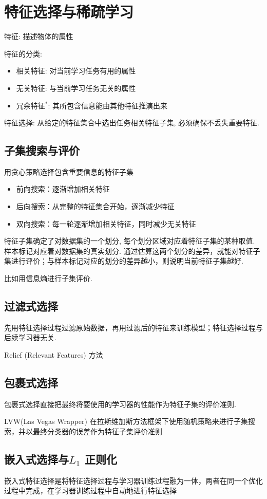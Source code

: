 \newpage
\section{特征选择与稀疏学习}
特征: 描述物体的属性

特征的分类:
\begin{itemize}
    \item 相关特征: 对当前学习任务有用的属性
    \item 无关特征: 与当前学习任务无关的属性
    \item 冗余特征${}^*$: 其所包含信息能由其他特征推演出来
\end{itemize}

特征选择: 从给定的特征集合中选出任务相关特征子集, 必须确保不丢失重要特征. 
\subsection{子集搜索与评价}
用贪心策略选择包含重要信息的特征子集
\begin{itemize}
    \item 前向搜索：逐渐增加相关特征
    \item 后向搜索：从完整的特征集合开始，逐渐减少特征
    \item 双向搜索：每一轮逐渐增加相关特征，同时减少无关特征
\end{itemize}

特征子集确定了对数据集的一个划分, 每个划分区域对应着特征子集的某种取值. 样本标记对应着对数据集的真实划分. 通过估算这两个划分的差异，就能对特征子集进行评价；与样本标记对应的划分的差异越小，则说明当前特征子集越好. 

比如用信息熵进行子集评价. 

\subsection{过滤式选择}
先用特征选择过程过滤原始数据，再用过滤后的特征来训练模型；特征选择过程与后续学习器无关. 

Relief (Relevant Features) 方法
\subsection{包裹式选择}
包裹式选择直接把最终将要使用的学习器的性能作为特征子集的评价准则. 


LVW(Las Vegas Wrapper) 在拉斯维加斯方法框架下使用随机策略来进行子集搜索，并以最终分类器的误差作为特征子集评价准则
\subsection{嵌入式选择与\texorpdfstring{$L_1$}.  正则化}
嵌入式特征选择是将特征选择过程与学习器训练过程融为一体，两者在同一个优化过程中完成，在学习器训练过程中自动地进行特征选择


